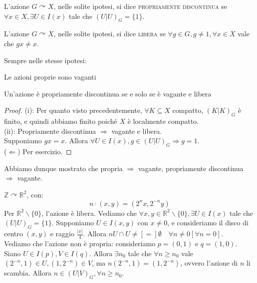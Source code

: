 \begin{defn}
L'azione $G \curvearrowright X$, nelle solite ipotesi, si dice \textsc{propriamente discontinua} se $\forall x \in X, \exists U \in I(x)$ tale che $(U|U)_G=\{1\}$.
\end{defn}

\begin{defn}
L'azione $G \curvearrowright X$, nelle solite ipotesi, si dice \textsc{libera} se $\forall g 	\in G,g \neq 1, \forall x \in X$ vale che $gx \neq x$.
\end{defn}

\begin{prop}
Sempre nelle stesse ipotesi:
\begin{nlist}
\item Le azioni proprie sono vaganti
\item Un'azione è propriamente discontinua se e solo se è vagante e libera
\end{nlist}
\end{prop}

\begin{proof}
(i): Per quanto visto precedentemente, $\forall K \subseteq X$ compatto, $(K|K)_G$ è finito, e quindi abbiamo finito poiché $X$ è localmente compatto.\\
(ii): Propriamente discontinua $\Longrightarrow$ vagante e libera.\\
Supponiamo $gx=x$. Allora $\forall U \in I(x), g \in (U|U)_G \Longrightarrow g=1$.\\
($\Longleftarrow$) Per esercizio.
\end{proof}

\begin{oss}
Abbiamo dunque mostrato che propria $\Longrightarrow$ vagante, propriamente discontinua $\Longrightarrow$ vagante.
\end{oss}

\begin{ex}
$\mathbb{Z} \curvearrowright \mathbb{R}^2$, con:
$$n \cdot (x,y)=(2^nx,2^{-n}y)$$
Per $\mathbb{R}^2 \smallsetminus \{0\}$, l'azione è libera. Vediamo che $\forall x,y \in \mathbb{R}^2 \smallsetminus \{0\}, \exists U \in I(x)$ tale che $(U|U)_G=\{1\}$. Supponiamo $U \in I(x,y)$ con $x \neq 0$, e consideriamo il disco di centro $(x,y)$ e raggio $\frac{|x|}{4}$. Allora $nU \cap U \neq [=] \emptyset \quad \forall n \neq 0 [\forall n=0]$.\\
Vediamo che l'azione non è propria: consideriamo $p=(0,1)$ e $q=(1,0)$. Siano $U \in I(p), V \in I(q)$. Allora $\exists n_0$ tale che $\forall n \ge n_0$ vale $(2^{-n},1) \in U, (1,2^{-n}) \in V$, ma $n(2^{-n},1)=(1,2^{-n})$, ovvero l'azione di $n$ li scambia. Allora $n \in (U|V)_G, \forall n \ge n_0$.
\end{ex}

